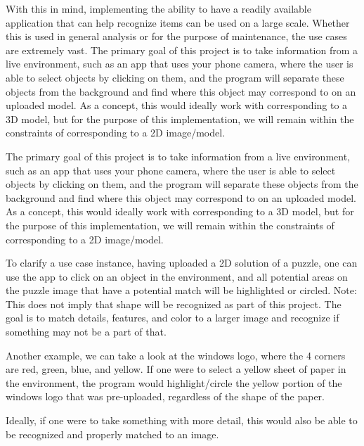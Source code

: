 \documentclass[letter,10pt]{article}
\begin{document}
\begin{multicols}{2}
            With this in mind, implementing the ability to have a readily available application that can help recognize items can be used on a large scale. Whether this is used in general analysis or for the purpose of maintenance, the use cases are extremely vast.
            The primary goal of this project is to take information from a live environment, such as an app that uses your phone camera, where the user is able to select objects by clicking on them, and the program will separate these objects from the background and find where this object may correspond to on an uploaded model. As a concept, this would ideally work with corresponding to a 3D model, but for the purpose of this implementation, we will remain within the constraints of corresponding to a 2D image/model. 
		\par
        \par
        The primary goal of this project is to take information from a live environment, such as an app that uses your phone camera, where the user is able to select objects by clicking on them, and the program will separate these objects from the background and find where this object may correspond to on an uploaded model. As a concept, this would ideally work with corresponding to a 3D model, but for the purpose of this implementation, we will remain within the constraints of corresponding to a 2D image/model.
        \par
        To clarify a use case instance, having uploaded a 2D solution of a puzzle, one can use the app to click on an object in the environment, and all potential areas on the puzzle image that have a potential match will be highlighted or circled. Note: This does not imply that shape will be recognized as part of this project. The goal is to match details, features, and color to a larger image and recognize if something may not be a part of that.
        \par
        Another example, we can take a look at the windows logo, where the 4 corners are red, green, blue, and yellow. If one were to select a yellow sheet of paper in the environment, the program would highlight/circle the yellow portion of the windows logo that was pre-uploaded, regardless of the shape of the paper.
        \par
        Ideally, if one were to take something with more detail, this would also be able to be recognized and properly matched to an image.
        

\end{multicols}
\end{document}
